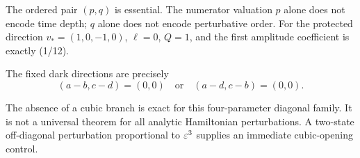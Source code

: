 The ordered pair \((p,q)\) is essential.  The numerator valuation \(p\) alone
does not encode time depth; \(q\) alone does not encode perturbative order.  For
the protected direction \(v_*=(1,0,-1,0)\), \(\ell=0\), \(Q=1\), and
the first amplitude coefficient is exactly (1/12).

\begin{corollary}\label{cor:darkrays}
The fixed dark directions are precisely
\[
(a-b,c-d)=(0,0)\quad\text{or}\quad(a-d,c-b)=(0,0).
\]
\end{corollary}

\begin{remark}
The absence of a cubic branch is exact for this four-parameter diagonal family.
It is not a universal theorem for all analytic Hamiltonian perturbations.  A
two-state off-diagonal perturbation proportional to \(\varepsilon^3\) supplies an
immediate cubic-opening control.
\end{remark}
